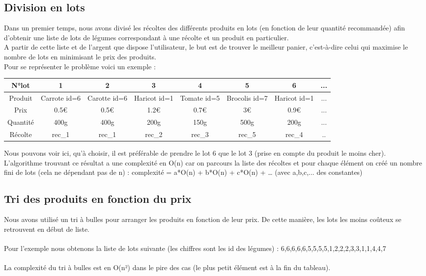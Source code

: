 \documentclass[12pt,titlepage]{report}
\begin{document}
\subsection{Division en lots}
Dans un premier temps, nous avons divisé les récoltes des différents produits en lots (en fonction de leur quantité recommandée) afin d’obtenir une liste de lots de légumes correspondant à une récolte et un produit en particulier. \\

A partir de cette liste et de l’argent que dispose l’utilisateur, le but est de trouver le meilleur panier, c'est-à-dire celui qui maximise le nombre de lots en minimisant le prix des produits. \\

\clearpage
Pour se représenter le problème voici un exemple :

\begin{center}
    \begin{tabular}{|c|c|c|c|c|c|c|c|}
    \hline
         N°lot & 1 & 2 & 3 & 4 & 5 & 6 & ... \\ \hline
        Produit & Carrote id=6 & Carotte id=6 & Haricot id=1 & Tomate id=5 & Brocolis id=7 & Haricot id=1 & ... \\ \hline
        Prix & 0.5€ & 0.5€ & 1.2€ & 0.7€ & 3€ & 0.9€ & ... \\ \hline
        Quantité & 400g & 400g & 200g & 150g & 500g & 200g & ...\\ \hline
        Récolte & rec_1 & rec_1 & rec_2 & rec_3 & rec_5 & rec_4 & ..\\ \hline
    \end{tabular}    
\end{center}


Nous pouvons voir ici, qu’à choisir, il est préférable de prendre le lot 6 que le lot 3 (prise en compte du produit le moins cher).\\
L'algorithme trouvant ce résultat a une complexité en O(n) car on parcours la liste des récoltes et pour chaque élément on créé un nombre fini de lots (cela ne dépendant pas de n) : complexité = a*O(n) + b*O(n) + c*O(n) + … (avec a,b,c,... des constantes)


\subsection{Tri des produits en fonction du prix}

Nous avons utilisé un tri à bulles pour arranger les produits en fonction de leur prix. De cette manière, les lots les moins coûteux se retrouvent en début de liste. \\  \\
Pour l'exemple nous obtenons la liste de lots suivante (les chiffres sont les id des légumes) : 6,6,6,6,6,5,5,5,5,1,2,2,2,3,3,1,1,4,4,7 \\ \\
La complexité du tri à bulles est en O(n²) dans le pire des cas (le plus petit élément est à la fin du tableau).
\end{document}
